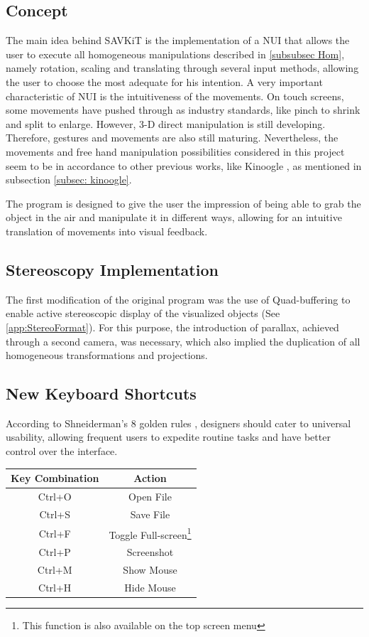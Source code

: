 \documentclass[12pt]{extarticle}
\begin{document}
\subsection {Concept}
The main idea behind SAVKiT is the implementation of a NUI that allows the user to execute all homogeneous manipulations described in \ref{subsubsec Hom}, namely rotation, scaling and translating through several input methods, allowing the user to choose the most adequate for his intention.
A very important characteristic of NUI is the intuitiveness of the movements. On touch screens, some movements have pushed through as industry standards, like pinch to shrink and split to enlarge. However, 3-D direct manipulation is still developing. Therefore, gestures and movements are also still maturing. Nevertheless, the movements and free hand manipulation possibilities considered in this project seem to be in accordance to other previous works, like Kinoogle \cite{Kinoogle}, as mentioned in subsection \ref{subsec: kinoogle}.

The program is designed to give the user the impression of being able to grab the object in the air and manipulate it in different ways, allowing for an intuitive translation of movements into visual feedback.

\subsection {Stereoscopy Implementation}
The first modification of the original program was the use of Quad-buffering to enable active stereoscopic display of the visualized objects (See \ref{app:StereoFormat}). For this purpose, the introduction of parallax, achieved through a second camera, was necessary, which also implied the duplication of all homogeneous transformations and projections.

\subsection {New Keyboard Shortcuts}
According to Shneiderman's 8 golden rules \cite{Shneiderman}, designers should cater to universal usability, allowing frequent users to expedite routine tasks and have better control over the interface.
\begin{center}

\begin{tabular}{|c|c|} \hline
\textbf{Key Combination} & \textbf{Action}\\ \hline
Ctrl+O & Open File\\\hline
Ctrl+S & Save File\\\hline
Ctrl+F & Toggle Full-screen\footnote{This function is also available on the top screen menu}\\\hline
Ctrl+P & Screenshot\\\hline
Ctrl+M & Show Mouse\\\hline
Ctrl+H & Hide Mouse\\\hline

\end{tabular}
\end{center}
\end{document}
